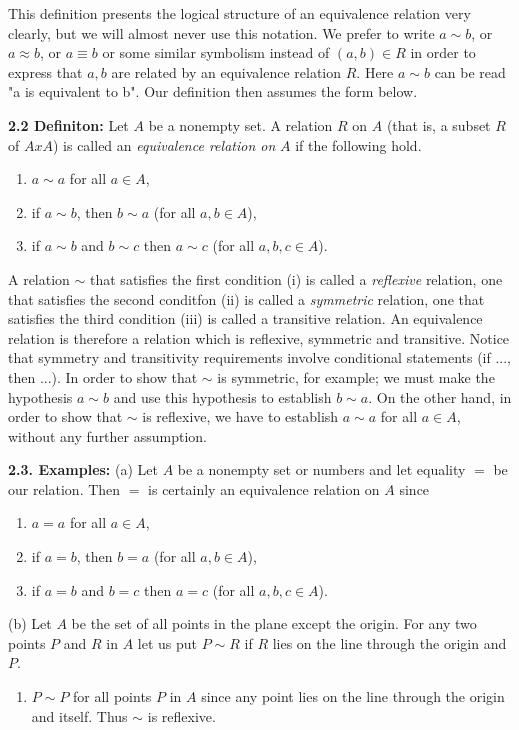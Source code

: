 \documentclass[11pt]{amsbook}
\begin{document}

\noindent
This definition presents the logical structure of an equivalence relation very clearly, but we will almost never use this notation. We prefer to write $a \sim b$, or $a \approx b$, or $a \equiv b$ or some similar symbolism instead of $(a,b) \in R$ in order to express that $a,b$ are related by an equivalence relation $R$. Here $a \sim b$ can be read "a is equivalent to b". Our definition then assumes the form below.

\noindent
\textbf{2.2 Definiton:} Let $A$ be a nonempty set. A relation $R$ on $A$ (that is, a subset $R$ of $A x A$) is called an \emph{equivalence relation on} $A$ if the following hold.

\begin{enumerate}[label=(\roman*)]
	\item $a \sim a$ for all $a \in A$,
	\item if $a \sim b$, then $b \sim a$ (for all $a,b \in A$),
	\item if $a \sim b$ and $b \sim c$ then $a \sim c$ (for all $a,b,c \in A$).
\end{enumerate}
\noindent
A relation $\sim$ that satisfies the first condition (i) is called a \emph{reflexive} relation, one that satisfies the second conditfon (ii) is called a \emph{symmetric} relation, one that satisfies the third condition (iii) is called a transitive relation. An equivalence relation is therefore a relation which is reflexive, symmetric and transitive. Notice that symmetry and transitivity requirements involve conditional statements (if ..., then ...). In order to show that $\sim$ is symmetric, for example; we must make the hypothesis $a \sim b$ and use this hypothesis to establish $b \sim a$. On the other hand, in order to show that $\sim$ is reflexive, we have to establish $a \sim a$ for all $a \in A$, without any further assumption.

\noindent
\textbf{2.3. Examples:} (a) Let $A$ be a nonempty set or numbers and let equality $=$ be our relation. Then $=$ is certainly an equivalence relation on $A$ since

\begin{enumerate}[label=(\roman*)]
	\item $a = a$ for all $a \in A$,
	\item if $a = b$, then $b = a$ (for all $a,b \in A$),
	\item if $a = b$ and $b = c$ then $a = c$ (for all $a,b,c \in A$).
\end{enumerate}
\noindent
(b) Let $A$ be the set of all points in the plane except the origin. For any two points $P$ and $R$ in $A$ let us put $P \sim R$ if $R$ lies on the line through the origin and $P$.
\begin{enumerate}[label=(\roman*)]
	\item $P \sim P$ for all points $P$ in $A$ since any point lies on the line through the origin and itself. Thus $\sim$ is reflexive.
\end{enumerate}

\end{document}
